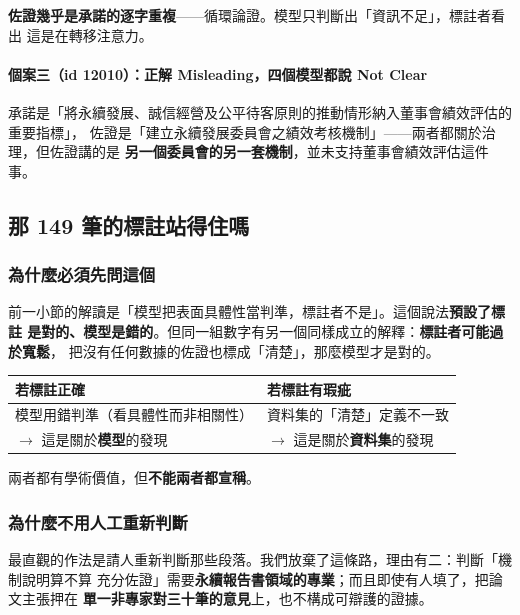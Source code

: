 \documentclass[11pt,a4paper]{ctexart}
\begin{document}
\textbf{佐證幾乎是承諾的逐字重複}——循環論證。模型只判斷出「資訊不足」，標註者看出
這是在轉移注意力。

\paragraph{個案三（id 12010）：正解 Misleading，四個模型都說 Not Clear}

承諾是「將永續發展、誠信經營及公平待客原則的推動情形納入董事會績效評估的重要指標」，
佐證是「建立永續發展委員會之績效考核機制」——兩者都關於治理，但佐證講的是\textbf{
另一個委員會的另一套機制}，並未支持董事會績效評估這件事。

\subsection{那 149 筆的標註站得住嗎}
\label{sec:consist}

\subsubsection{為什麼必須先問這個}

前一小節的解讀是「模型把表面具體性當判準，標註者不是」。這個說法\textbf{預設了標註
是對的、模型是錯的}。但同一組數字有另一個同樣成立的解釋：\textbf{標註者可能過於寬鬆}，
把沒有任何數據的佐證也標成「清楚」，那麼模型才是對的。

\begin{table}[h]
\centering\small
\begin{tabular}{@{}p{6.6cm}p{6.6cm}@{}}
\toprule
若標註正確 & 若標註有瑕疵 \\
\midrule
模型用錯判準（看具體性而非相關性） & 資料集的「清楚」定義不一致 \\
$\to$ 這是關於\textbf{模型}的發現 & $\to$ 這是關於\textbf{資料集}的發現 \\
\bottomrule
\end{tabular}
\end{table}

兩者都有學術價值，但\textbf{不能兩者都宣稱}。

\subsubsection{為什麼不用人工重新判斷}

最直觀的作法是請人重新判斷那些段落。我們放棄了這條路，理由有二：判斷「機制說明算不算
充分佐證」需要\textbf{永續報告書領域的專業}；而且即使有人填了，把論文主張押在\textbf{
單一非專家對三十筆的意見}上，也不構成可辯護的證據。
\end{document}
